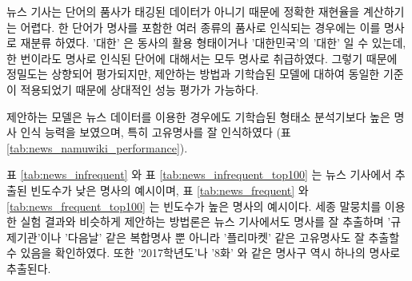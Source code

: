 \documentclass[oneside, ko,phd]{snuthesis_utf8_kor}
\begin{document}
뉴스 기사는 단어의 품사가 태깅된 데이터가 아니기 때문에 정확한 재현율을 계산하기는 어렵다.
한 단어가 명사를 포함한 여러 종류의 품사로 인식되는 경우에는 이를 명사로 재분류 하였다.
'대한' 은 동사의 활용 형태이거나 '대한민국'의 '대한' 일 수 있는데, 한 번이라도 명사로 인식된 단어에 대해서는 모두 명사로 취급하였다.
그렇기 때문에 정밀도는 상향되어 평가되지만, 제안하는 방법과 기학습된 모델에 대하여 동일한 기준이 적용되었기 때문에 상대적인 성능 평가가 가능하다.

제안하는 모델은 뉴스 데이터를 이용한 경우에도  기학습된 형태소 분석기보다 높은 명사 인식 능력을 보였으며, 특히 고유명사를 잘 인식하였다 (표 \ref{tab:news_namuwiki_performance}).

표 \ref{tab:news_infrequent} 와 표 \ref{tab:news_infrequent_top100} 는 뉴스 기사에서 추출된 빈도수가 낮은 명사의 예시이며, 표 \ref{tab:news_frequent} 와 \ref{tab:news_frequent_top100} 는 빈도수가 높은 명사의 예시이다.
세종 말뭉치를 이용한 실험 결과와 비슷하게 제안하는 방법론은 뉴스 기사에서도 명사를 잘 추출하며 '규제기관'이나 '다음날' 같은 복합명사 뿐 아니라 '플리마켓' 같은 고유명사도 잘 추출할 수 있음을 확인하였다.
또한 '2017학년도'나 '8화' 와 같은 명사구 역시 하나의 명사로 추출된다.

\begin{table}[ht]
\centering
\caption{뉴스 기사에서 명사로 추출된 빈도수가 작은 12 개의 명사 예시 (Logistic Regression 의 판별 확률, 출현 빈도수)}
\label{tab:news_infrequent}
\end{table}

\begin{table}[ht]
\centering
\caption{뉴스 기사에서 명사로 추출된 12 개의 명사 예시 (정렬 기준 = 판별 확률 $\times$ 출현 빈도수)}
\label{tab:news_frequent}
\end{table}
\end{document}
